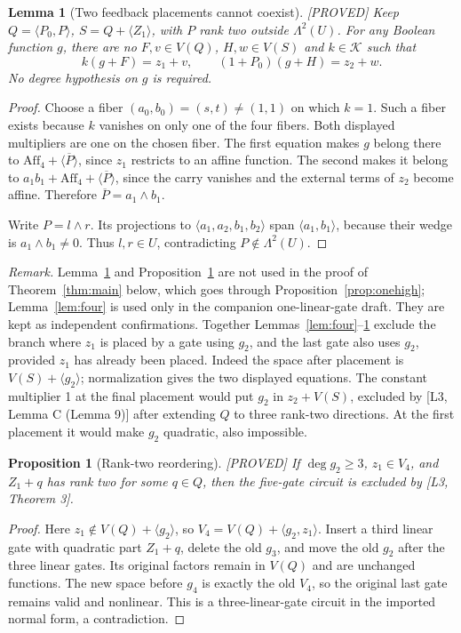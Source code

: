\documentclass[11pt,a4paper]{article}
\newtheorem{lemma}[theorem]{Lemma}
\newtheorem{proposition}[theorem]{Proposition}
\newcommand{\Aff}{\mathrm{Aff}}
\newcommand{\status}[1]{\hfill\textsf{[#1]}}
\begin{document}
\begin{lemma}[Two feedback placements cannot coexist]\label{lem:two}\status{PROVED}
Keep $Q=\langle P_0,P\rangle$, $S=Q+\langle Z_1\rangle$, with $P$ rank two outside $\Lambda^2(U)$. For any Boolean function $g$, there are no $F,v\in V(Q)$, $H,w\in V(S)$ and $k\in\mathcal K$ such that
\[
k(g+F)=z_1+v,\qquad (1+P_0)(g+H)=z_2+w.
\]
No degree hypothesis on $g$ is required.
\end{lemma}
\begin{proof}
Choose a fiber $(a_0,b_0)=(s,t)\ne(1,1)$ on which $k=1$. Such a fiber exists because $k$ vanishes on only one of the four fibers. Both displayed multipliers are one on the chosen fiber. The first equation makes $g$ belong there to $\Aff_4+\langle\overline P\rangle$, since $z_1$ restricts to an affine function. The second makes it belong to $a_1b_1+\Aff_4+\langle\overline P\rangle$, since the carry vanishes and the external terms of $z_2$ become affine. Therefore $\overline P=a_1\wedge b_1$.

Write $P=l\wedge r$. Its projections to $\langle a_1,a_2,b_1,b_2\rangle$ span $\langle a_1,b_1\rangle$, because their wedge is $a_1\wedge b_1\ne0$. Thus $l,r\in U$, contradicting $P\notin\Lambda^2(U)$.
\end{proof}
\emph{Remark.} Lemma~\ref{lem:two} and Proposition~\ref{prop:reorder} are not used in the proof of Theorem~\ref{thm:main} below, which goes through Proposition~\ref{prop:onehigh}; Lemma~\ref{lem:four} is used only in the companion one-linear-gate draft. They are kept as independent confirmations. Together Lemmas~\ref{lem:four}--\ref{lem:two} exclude the branch where $z_1$ is placed by a gate using $g_2$, and the last gate also uses $g_2$, provided $z_1$ has already been placed. Indeed the space after placement is $V(S)+\langle g_2\rangle$; normalization gives the two displayed equations. The constant multiplier 1 at the final placement would put $g_2$ in $z_2+V(S)$, excluded by [L3, Lemma C (Lemma 9)] after extending $Q$ to three rank-two directions. At the first placement it would make $g_2$ quadratic, also impossible.

\begin{proposition}[Rank-two reordering]\label{prop:reorder}\status{PROVED}
If $\deg g_2\ge3$, $z_1\in V_4$, and $Z_1+q$ has rank two for some $q\in Q$, then the five-gate circuit is excluded by [L3, Theorem 3].
\end{proposition}
\begin{proof}
Here $z_1\notin V(Q)+\langle g_2\rangle$, so $V_4=V(Q)+\langle g_2,z_1\rangle$. Insert a third linear gate with quadratic part $Z_1+q$, delete the old $g_3$, and move the old $g_2$ after the three linear gates. Its original factors remain in $V(Q)$ and are unchanged functions. The new space before $g_4$ is exactly the old $V_4$, so the original last gate remains valid and nonlinear. This is a three-linear-gate circuit in the imported normal form, a contradiction.
\end{proof}
\end{document}
